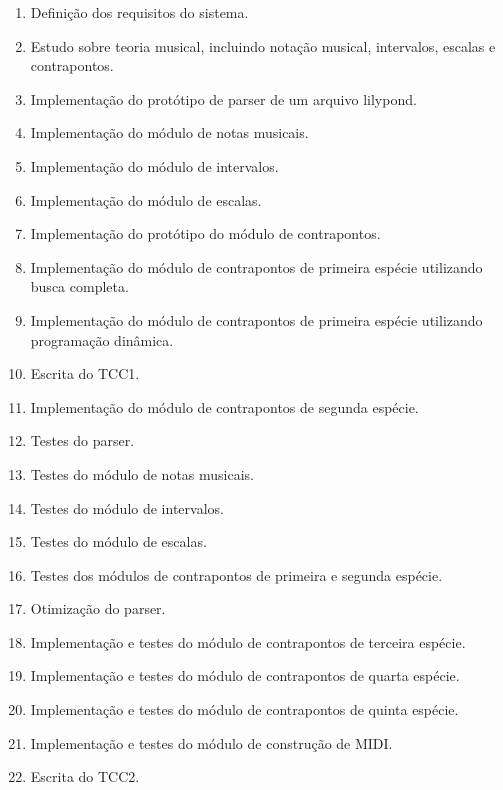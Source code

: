   \begin{enumerate}
    \item \label{t1} Definição dos requisitos do sistema.
    \item \label{t2} Estudo sobre teoria musical, incluindo notação musical, intervalos, escalas e contrapontos.
    \item \label{t3} Implementação do protótipo de parser de um arquivo lilypond.
    \item \label{t4} Implementação do módulo de notas musicais.
    \item \label{t5} Implementação do módulo de intervalos.
    \item \label{t6} Implementação do módulo de escalas.
    \item \label{t7} Implementação do protótipo do módulo de contrapontos.
    \item \label{t8} Implementação do módulo de contrapontos de primeira espécie utilizando busca completa.
    \item \label{t9} Implementação do módulo de contrapontos de primeira espécie utilizando programação dinâmica.
    \item \label{t10} Escrita do TCC1.
    \item \label{t11} Implementação do módulo de contrapontos de segunda espécie.
    \item \label{t12} Testes do parser.
    \item \label{t13} Testes do módulo de notas musicais.
    \item \label{t14} Testes do módulo de intervalos.
    \item \label{t15} Testes do módulo de escalas.
    \item \label{t16} Testes dos módulos de contrapontos de primeira e segunda espécie.
    \item \label{t17} Otimização do parser.
    \item \label{t18} Implementação e testes do módulo de contrapontos de terceira espécie.
    \item \label{t19} Implementação e testes do módulo de contrapontos de quarta espécie.
    \item \label{t20} Implementação e testes do módulo de contrapontos de quinta espécie.
    \item \label{t21} Implementação e testes do módulo de construção de MIDI.
    \item \label{t22} Escrita do TCC2.
  \end{enumerate}

